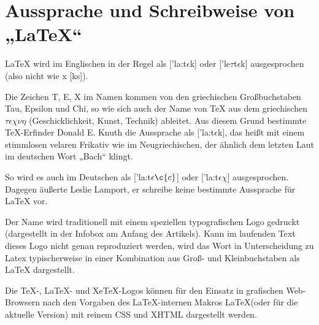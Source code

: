 
\section{Aussprache und Schreibweise von „\LaTeX“}

LaTeX wird im Englischen in der Regel als ['la:t$\epsilon$k] oder ['le$\tau$t$\epsilon$k] ausgesprochen (also nicht wie x [ks]).

Die Zeichen T, E, X im Namen kommen von den griechischen Großbuchstaben Tau, Epsilon und Chi, so wie sich auch der Name von TeX aus dem griechischen $\tau\epsilon\chi\nu\eta$ (Geschicklichkeit, Kunst, Technik) ableitet. Aus diesem Grund bestimmte TeX-Erfinder Donald E. Knuth die Aussprache als ['la:t$\epsilon$k],\cite{Knuth} das heißt mit einem stimmlosen velaren Frikativ wie im Neugriechischen, der ähnlich dem letzten Laut im deutschen Wort „Bach“ klingt.

So wird es auch im Deutschen als ['la:t$\epsilon\c{c}$] oder ['la:t$\epsilon \chi$] ausgesprochen. Dagegen äußerte Leslie Lamport, er schreibe keine bestimmte Aussprache für LaTeX vor.

Der Name wird traditionell mit einem speziellen typografischen Logo gedruckt (dargestellt in der Infobox am Anfang des Artikels). Kann im laufenden Text dieses Logo nicht genau reproduziert werden, wird das Wort in Unterscheidung zu Latex typischerweise in einer Kombination aus Groß- und Kleinbuchstaben als LaTeX dargestellt.

Die TeX-, LaTeX-\cite{Connor} und XeTeX\cite{tara}-Logos können für den Einsatz in grafischen Web-Browsern nach den Vorgaben des LaTeX-internen Makros \LaTeX (oder \LaTeXe für die aktuelle Version) mit reinem CSS und XHTML dargestellt werden.\cite{Walden}